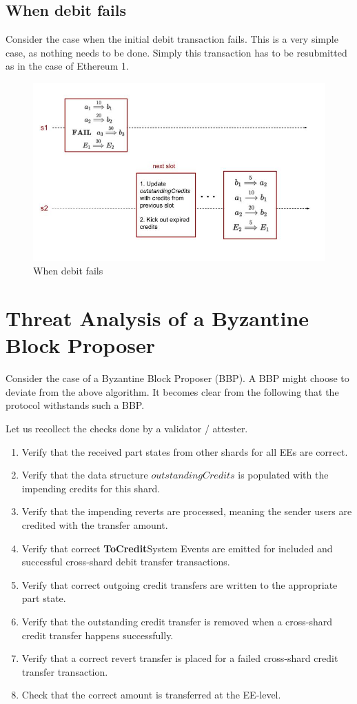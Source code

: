 \documentclass{article}
\newcommand{\tocredit}[0]{{\bf ToCredit}}
\begin{document}
\subsection{When debit fails}
Consider the case when the initial debit transaction fails. This is a very simple case, as nothing needs to be done. Simply this transaction has to be resubmitted as in the case of Ethereum 1.

\begin{figure}[h]
	\includegraphics[scale=0.4]{Debit.jpg}
	\caption{When debit fails\label{fig:debit}}
\end{figure}

\section{Threat Analysis of a Byzantine Block Proposer}
\label{sec:threat}
Consider the case of a Byzantine Block Proposer (BBP). A BBP might choose to deviate from the above algorithm. It becomes clear from the following that the protocol withstands such a BBP.

Let us recollect the checks done by a validator / attester.
\begin{enumerate}
\item Verify that the received part states from other shards for all EEs are correct.
\item Verify that the data structure $outstandingCredits$ is populated with the impending credits for this shard.
\item Verify that the impending reverts are processed, meaning the sender users are credited with the transfer amount.
\item Verify that correct \tocredit System Events are emitted for included and successful cross-shard debit transfer transactions.
\item Verify that correct outgoing credit transfers are written to the appropriate part state.
\item Verify that the outstanding credit transfer is removed when a cross-shard credit transfer happens successfully.
\item Verify that a correct revert transfer is placed for a failed cross-shard credit transfer transaction.
\item Check that the correct amount is transferred at the EE-level.
\end{enumerate}
\end{document}
